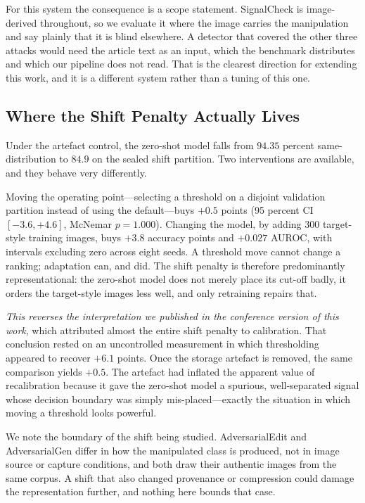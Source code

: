 \documentclass[pdflatex,sn-mathphys-num]{sn-jnl}
\newcommand{\sysname}{SignalCheck}
\begin{document}
For this system the consequence is a scope statement. \sysname{} is
image-derived throughout, so we evaluate it where the image carries the
manipulation and say plainly that it is blind elsewhere. A detector that
covered the other three attacks would need the article text as an input, which
the benchmark distributes and which our pipeline does not read. That is the
clearest direction for extending this work, and it is a different system rather
than a tuning of this one.

\subsection{Where the Shift Penalty Actually Lives}
\label{sec:shiftdiscussion}

Under the artefact control, the zero-shot model falls from $94.35$ percent
same-distribution to $84.9$ on the sealed shift partition. Two interventions
are available, and they behave very differently.

Moving the operating point---selecting a threshold on a disjoint validation
partition instead of using the default---buys $+0.5$ points
(95 percent CI $[-3.6, +4.6]$, McNemar $p = 1.000$). Changing the model, by
adding 300 target-style training images, buys $+3.8$ accuracy points and
$+0.027$ AUROC, with intervals excluding zero across eight seeds. A threshold
move cannot change a ranking; adaptation can, and did. The shift penalty is
therefore predominantly representational: the zero-shot model does not merely
place its cut-off badly, it orders the target-style images less well, and only
retraining repairs that.

\emph{This reverses the interpretation we published in the conference version
of this work}, which attributed almost the entire shift penalty to calibration.
That conclusion rested on an uncontrolled measurement in which thresholding
appeared to recover $+6.1$ points. Once the storage artefact is removed, the
same comparison yields $+0.5$. The artefact had inflated the apparent value of
recalibration because it gave the zero-shot model a spurious, well-separated
signal whose decision boundary was simply mis-placed---exactly the situation in
which moving a threshold looks powerful.

We note the boundary of the shift being studied. AdversarialEdit and
AdversarialGen differ in how the manipulated class is produced, not in image
source or capture conditions, and both draw their authentic images from the
same corpus. A shift that also changed provenance or compression could damage
the representation further, and nothing here bounds that case.
\end{document}
